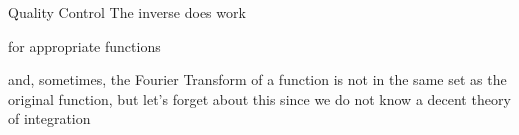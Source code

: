     \begin{frame}{Quality Control}
        \centering
        \huge{The inverse does work}
        
        \normalsize{for appropriate functions}
        
        \tiny{and, sometimes, the Fourier Transform of a function is not in the same set as the original function, but let's forget about this since we do not know a decent theory of integration}
    \end{frame}
